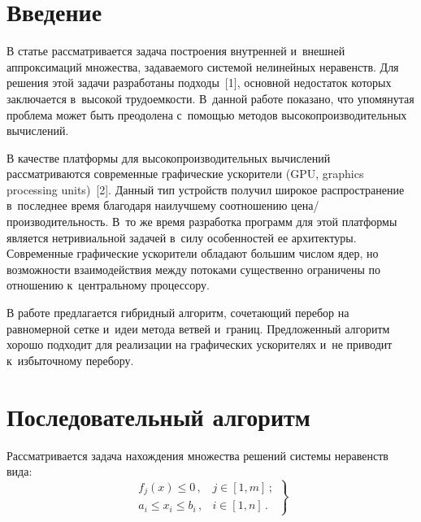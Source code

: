  



\thispagestyle{headings}

\begin{multicols}{2}

\label{st\stat}

\section{Введение}

     В статье рассматривается задача построения внутренней и~внешней 
аппроксимаций множества, задаваемого системой нелинейных неравенств. Для 
решения этой задачи разработаны подходы~[1], основной недостаток которых 
заключается в~высокой трудоемкости. В~данной работе показано, что 
упомянутая проблема может быть преодолена с~помощью методов 
высокопроизводительных вычислений. 
     
     В качестве платформы для высокопроизводительных вычислений 
рассматриваются современные графические ускорители (GPU, graphics processing units)~[2]. 
Данный тип 
устройств получил широкое распространение в~последнее время благодаря 
наилучшему соотношению це\-на/про\-из\-во\-ди\-тель\-ность. В~то же время 
разработка программ для этой платформы является нетривиальной задачей 
в~силу особенностей ее архитектуры. Современные графические ускорители 
обладают большим числом ядер, но возможности взаимодействия между 
потоками существенно ограничены по отношению к~центральному про\-цес\-сору.
      
     В работе предлагается гибридный алгоритм, сочетающий перебор на 
равномерной сетке и~идеи метода ветвей и~границ. Предложенный алгоритм 
хорошо подходит для реализации на графических ускорителях и~не приводит 
к~избыточному пе\-ре\-бору. 
     
\section{Последовательный алгоритм}

     Рассматривается задача нахождения множества решений системы 
неравенств вида:
     \begin{equation}
     \left.
     \begin{array}{rl}
     f_j(x)\leq 0\,, & j\in [1,m]\,;\\[6pt]
     a_i\leq x_i\leq b_i\,, & i\in [1,n]\,.
     \end{array}
     \right\}
     \label{e1.1-pos}
     \end{equation}
      

\end{multicols}
